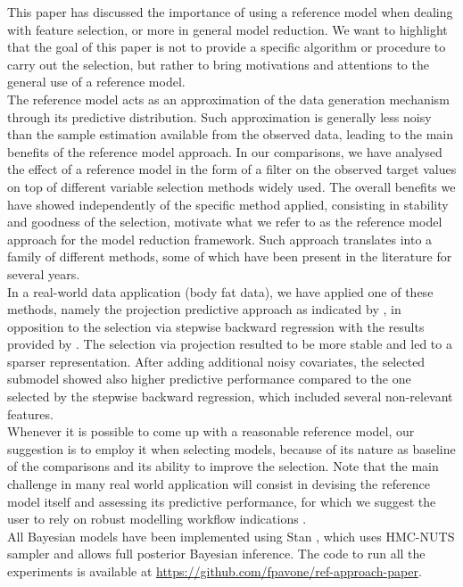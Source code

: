 \documentclass[american,]{article}
\theoremstyle{definition}
\begin{document}
This paper has discussed the importance of using a reference model when dealing with feature selection, or more in general model reduction. We want to highlight that the goal of this paper is not to provide a specific algorithm or procedure to carry out the selection, but rather to bring motivations and attentions to the general use of a reference model. 
\\
The reference model acts as an approximation of the data generation mechanism through its predictive distribution. Such approximation is generally less noisy than the sample estimation available from the observed data, leading to the main benefits of the reference model approach. In our comparisons, we have analysed the effect of a reference model in the form of a filter on the observed target values on top of different variable selection methods widely used. The overall benefits we have showed independently of the specific method applied, consisting in stability and goodness of the selection, motivate what we refer to as the reference model approach for the model reduction framework. Such approach translates into a family of different methods, some of which have been present in the literature for several years.
\\
In a real-world data application (body fat data), we have applied one of these methods, namely the projection predictive approach as indicated by \cite{paper:projpred}, in opposition to the selection via stepwise backward regression with the results provided by \cite{paper:bodyfat}. The selection via projection resulted to be more stable and led to a sparser representation. After adding additional noisy covariates, the selected submodel showed also higher predictive performance compared to the one selected by the stepwise backward regression, which included several non-relevant features.
\\
Whenever it is possible to come up with a reasonable reference model, our suggestion is to employ it when selecting models, because of its nature as baseline of the comparisons and its ability to improve the selection. Note that the main challenge in many real world application will consist in devising the reference model itself and assessing its predictive performance, for which we suggest the user to rely on robust modelling workflow indications \cite[see e.g.][]{gabry2019visualization}.
\\
All Bayesian models have been implemented using Stan \citep{paper:stan}, which uses HMC-NUTS sampler \citep{paper:NUTS} and allows full posterior Bayesian inference. The code to run all the experiments is available at \url{https://github.com/fpavone/ref-approach-paper}. 




 

\end{document}
